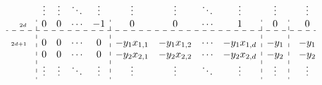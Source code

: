 \documentclass{article}
\begin{document}
\[\begin{array}{rl@{}:cccc:cccc:c:@{}r r@{}c@{}l}
                           &                                                                                            & \vdots         & \vdots & \ddots & \vdots         & \vdots            & \vdots       & \ddots & \vdots           & \vdots             &                                                                                            &                                                                                            & \vdots                                                                                              \\
        \scriptscriptstyle 2d    &                                                                                            & 0              & 0      & \cdots & -1             & 0                 & 0            & \cdots & 1                & 0                  &                                                                                            &                                                                                            & 0                                                                                                   \\
        \hdashline
        \rule{0pt}{1.5em}
        \scriptscriptstyle{2d+1} &                                                                                            & 0              & 0      & \cdots & 0              & -y_1x_{1, 1}      & -y_1x_{1, 2} & \cdots & -y_1x_{1, d}     & -y_1               &                                                                                            &                                                                                            & -y_1                                                                                                \\
                           &                                                                                            & 0              & 0      & \cdots & 0              & -y_2x_{2, 1}      & -y_2x_{2, 2} & \cdots & -y_2x_{2, d}     & -y_2               &                                                                                            &                                                                                            & -y_2                                                                                                \\
                           &                                                                                            & \vdots         & \vdots & \ddots & \vdots         & \vdots            & \vdots       & \ddots & \vdots           & \vdots             &                                                                                            &                                                                                            & \vdots                                                                                              \\

\end{array}\]
\end{document}
